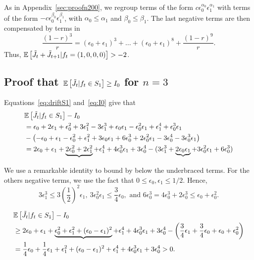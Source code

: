 \documentclass[11pt]{article}
\theoremstyle{plain}
\theoremstyle{definition}
\theoremstyle{remark}
\newcommand{\esp}[1]{\mathbb{E}\left[ #1 \right]}
\begin{document}
As in Appendix~\ref{sec:proofn200}, we regroup terms of the form $c \epsilon_0^{\alpha_0} \epsilon_1^{\alpha_1}$ with terms of the form $-c \epsilon_0^{\beta_0} \epsilon_1^{\beta_1}$, with $\alpha_0 \leq \alpha_1$ and $\beta_0 \leq \beta_1$. The last negative terms are then compensated by terms in 
\begin{displaymath}
 \frac{(1-r)^3}{r} = (\epsilon_0+\epsilon_1)^3 + \dots + (\epsilon_0+\epsilon_1)^8 + \frac{(1-r)^9}{r}.
\end{displaymath}
Thus, $\esp{\Tilde{J}_{t} + \Tilde{J}_{t+1}|f_t=(1,0,0,0)} > -2$.

\subsection{Proof that $\esp{\Tilde{J}_t | f_t \in S_1 } \geq I_0$ for $n=3$} \label{sec:cn3ft0}
Equations~\eqref{eq:driftS1} and~\eqref{eq:I0} give that
\begin{align*}
& \esp{\Tilde{J}_t | f_t \in S_1 } - I_0 \\
& = \epsilon_0+2\epsilon_1 + \epsilon_0^2 + 3 \epsilon_1^2 - 3 \epsilon_1^3 + \epsilon_0 \epsilon_1 - \epsilon_0^2 \epsilon_1 + \epsilon_1^4 + \epsilon_0^3 \epsilon_1 \\
& - \left(-\epsilon_0 + \epsilon_1 - \epsilon_0^2 + \epsilon_1^2 + 3 \epsilon_0 \epsilon_1 + 6 \epsilon_0^3 + 2 \epsilon_0^2 \epsilon_1 - 3 \epsilon_0^4 - 3 \epsilon_0^3 \epsilon_1 \right)\\
& = 2 \epsilon_0 + \epsilon_1 + \underbrace{2 \epsilon_0^2 + 2 \epsilon_1^2} + \epsilon_1^4 + 4 \epsilon_0^3 \epsilon_1 + 3 \epsilon_0^4
- (3 \epsilon_1^3 + \underbrace{2 \epsilon_0 \epsilon_1} + 3 \epsilon_0^2 \epsilon_1 + 6\epsilon_0^3 )
\end{align*}

We use a remarkable identity to bound by below the underbraced terms. For the others negative terms, we use the fact that $0 \leq \epsilon_0, \epsilon_1 \leq 1/2$. Hence, 
\begin{displaymath}
3 \epsilon_1^3 \leq 3 \left( \frac{1}{2} \right)^2 \epsilon_1, \ 3 \epsilon_0^2 \epsilon_1 \leq \frac{3}{4} \epsilon_0, \text{ and } 6 \epsilon_0^3 = 4 \epsilon_0^3 + 2 \epsilon_0^3 \leq \epsilon_0 + \epsilon_0^2.
\end{displaymath}

\begin{align*}
& \esp{\Tilde{J}_t | f_t \in S_1 } - I_0 \\
& \geq 2 \epsilon_0 + \epsilon_1 +  \underbrace{\epsilon_0^2 + \epsilon_1^2 +(\epsilon_0-\epsilon_1)^2} + \epsilon_1^4 + 4 \epsilon_0^3 \epsilon_1 + 3 \epsilon_0^4
- \left(\frac{3}{4} \epsilon_1 + \frac{3}{4} \epsilon_0 + \epsilon_0+\epsilon_0^2  \right)\\
& = \frac{1}{4}\epsilon_0 + \frac{1}{4}\epsilon_1 + \epsilon_1^2 +(\epsilon_0-\epsilon_1)^2 + \epsilon_1^4 + 4 \epsilon_0^3 \epsilon_1 + 3 \epsilon_0^4 >0.
\end{align*}
\end{document}
